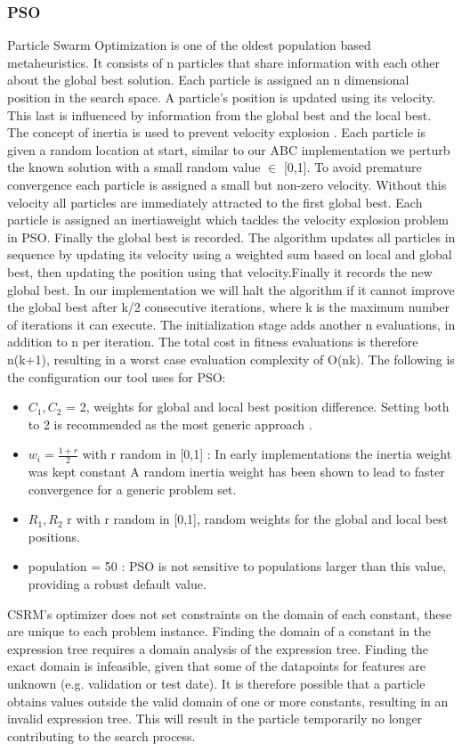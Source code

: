 \subsubsection{PSO}
Particle Swarm Optimization \cite{PSO} is one of the oldest population based metaheuristics. It consists of n particles that share information with each other about the global best solution.
Each particle is assigned an n dimensional position in the search space. A particle's position is updated using its velocity. This last is influenced by information from the global best and the local best. The concept of inertia is used to prevent velocity explosion \cite{PSOExplosion}.
Each particle is given a random location at start, similar to our ABC implementation we perturb the known solution with a small random value $\in$ [0,1].
To avoid premature convergence each particle is assigned a small but non-zero velocity. Without this velocity all particles are immediately attracted to the first global best. Each particle is assigned an inertiaweight which tackles the velocity explosion problem in PSO. Finally the global best is recorded. 
The algorithm updates all particles in sequence by updating its velocity using a weighted sum based on local and global best, then updating the position using that velocity.Finally it records the new global best.
In our implementation we will halt the algorithm if it cannot improve the global best after k/2 consecutive iterations, where k is the maximum number of iterations it can execute. The initialization stage adds another n evaluations, in addition to n per iteration. The total cost in fitness evaluations is therefore n(k+1), resulting in a worst case evaluation complexity of O(nk).
The following is the configuration our tool uses for PSO:
\begin{itemize}
\item $C_1, C_2$ = 2, weights for global and local best position difference. Setting both to 2 is recommended as the most generic approach \cite{PSOParameter}.
\item $w_i = \frac{1 + r}{2}$ with r random in [0,1] : In early implementations the inertia weight was kept constant \cite{PSOInertiaShi} A random inertia weight has been shown \cite{PSOInertia} to lead to faster convergence for a generic problem set.
\item $R_1, R_2$ r with r random in [0,1], random weights for the global and local best positions. 
\item population = 50 : PSO is not sensitive to populations larger than this value, providing a robust default value. \cite{SwarmIntelligence}
\end{itemize}
CSRM's optimizer does not set constraints on the domain of each constant, these are unique to each problem instance. 
Finding the domain of a constant in the expression tree requires a domain analysis of the expression tree. Finding the exact domain is infeasible, given that some of the datapoints for features are unknown (e.g. validation or test date). It is therefore possible that a particle obtains values outside the valid domain of one or more constants, resulting in an invalid expression tree. This will result in the particle temporarily no longer contributing to the search process.
